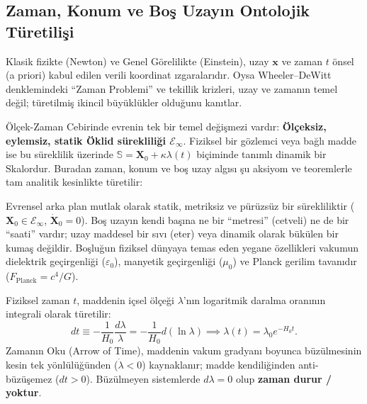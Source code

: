 \subsection{Zaman, Konum ve Boş Uzayın Ontolojik Türetilişi}
\label{sec:zaman_konum_turetilis_main}

Klasik fizikte (Newton) ve Genel Görelilikte (Einstein), uzay $\mathbf{x}$ ve zaman $t$ önsel (a priori) kabul edilen verili koordinat ızgaralarıdır. Oysa Wheeler--DeWitt denklemindeki ``Zaman Problemi'' ve tekillik krizleri, uzay ve zamanın temel değil; türetilmiş ikincil büyüklükler olduğunu kanıtlar.

Ölçek-Zaman Cebirinde evrenin tek bir temel değişmezi vardır: \textbf{Ölçeksiz, eylemsiz, statik Öklid sürekliliği $\mathcal{E}_\infty$}. Fiziksel bir gözlemci veya bağlı madde ise bu süreklilik üzerinde $\mathbb{S} = \mathbf{X}_0 + \kappa \lambda(t)$ biçiminde tanımlı dinamik bir Skalordur. Buradan zaman, konum ve boş uzay algısı şu aksiyom ve teoremlerle tam analitik kesinlikte türetilir:

\begin{axiom}
    \label{ax:statik_sureklilik_main}
    Evrensel arka plan mutlak olarak statik, metriksiz ve pürüzsüz bir sürekliliktir ($\mathbf{X}_0 \in \mathcal{E}_\infty$, $\dot{\mathbf{X}}_0 = 0$). Boş uzayın kendi başına ne bir ``metresi'' (cetveli) ne de bir ``saati'' vardır; uzay maddesel bir sıvı (eter) veya dinamik olarak bükülen bir kumaş değildir. Boşluğun fiziksel dünyaya temas eden yegane özellikleri vakumun dielektrik geçirgenliği ($\varepsilon_0$), manyetik geçirgenliği ($\mu_0$) ve Planck gerilim tavanıdır ($F_{\mathrm{Planck}} = c^4/G$).
\end{axiom}

\begin{theorem}[Zamanın Türetilişi: Zaman = Büzülmenin İçsel Günlüğü]
    \label{thm:zaman_turetilis}
    Fiziksel zaman $t$, maddenin içsel ölçeği $\lambda$'nın logaritmik daralma oranının integrali olarak türetilir:
    \begin{equation}
        dt \equiv -\frac{1}{H_0} \frac{d\lambda}{\lambda} = -\frac{1}{H_0} d(\ln \lambda) \implies \lambda(t) = \lambda_0 e^{-H_0 t}.
        \label{eq:zaman_turetilis_main}
    \end{equation}
    Zamanın Oku (Arrow of Time), maddenin vakum gradyanı boyunca büzülmesinin kesin tek yönlülüğünden ($\dot{\lambda} < 0$) kaynaklanır; madde kendiliğinden anti-büzüşemez ($dt > 0$). Büzülmeyen sistemlerde $d\lambda = 0$ olup \textbf{zaman durur / yoktur}.
\end{theorem}

